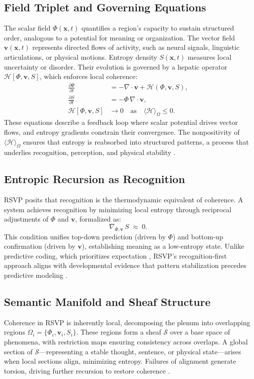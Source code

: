 \documentclass[11pt]{article}
\begin{document}
\subsection{Field Triplet and Governing Equations}
The scalar field $\Phi(\mathbf{x},t)$ quantifies a region’s capacity to sustain structured order, analogous to a potential for meaning or organization. The vector field $\mathbf{v}(\mathbf{x},t)$ represents directed flows of activity, such as neural signals, linguistic articulations, or physical motions. Entropy density $S(\mathbf{x},t)$ measures local uncertainty or disorder. Their evolution is governed by a hepatic operator $\mathcal{H}[\Phi,\mathbf{v},S]$, which enforces local coherence:
\begin{align}
\frac{\partial \Phi}{\partial t} &= -\nabla \!\cdot\! \mathbf{v} + \mathcal{H}(\Phi,\mathbf{v},S), \label{eq:phi-evo}\\[4pt]
\frac{\partial S}{\partial t} &= -\Phi\, \nabla \!\cdot\! \mathbf{v}, \label{eq:entropy-evo}\\[4pt]
\mathcal{H}[\Phi,\mathbf{v},S] &\to 0 \quad \text{as} \quad \langle \mathcal{H} \rangle_\Omega \le 0. \label{eq:hepatic}
\end{align}
These equations describe a feedback loop where scalar potential drives vector flows, and entropy gradients constrain their convergence. The nonpositivity of $\langle \mathcal{H} \rangle_\Omega$ ensures that entropy is reabsorbed into structured patterns, a process that underlies recognition, perception, and physical stability \citep{engbersen2013brains}.

\subsection{Entropic Recursion as Recognition}
RSVP posits that recognition is the thermodynamic equivalent of coherence. A system achieves recognition by minimizing local entropy through reciprocal adjustments of $\Phi$ and $\mathbf{v}$, formalized as:
\[
\nabla_{\!\Phi,\mathbf{v}}\,S \;\approx\; 0.
\]
This condition unifies top-down prediction (driven by $\Phi$) and bottom-up confirmation (driven by $\mathbf{v}$), establishing meaning as a low-entropy state. Unlike predictive coding, which prioritizes expectation \citep{friston2010free}, RSVP’s recognition-first approach aligns with developmental evidence that pattern stabilization precedes predictive modeling \citep{piaget1980thinking, gibson1979ecological}.

\subsection{Semantic Manifold and Sheaf Structure}
Coherence in RSVP is inherently local, decomposing the plenum into overlapping regions $\Omega_i = \{\Phi_i, \mathbf{v}_i, S_i\}$. These regions form a sheaf $\mathcal{S}$ over a base space of phenomena, with restriction maps ensuring consistency across overlaps. A global section of $\mathcal{S}$---representing a stable thought, sentence, or physical state---arises when local sections align, minimizing entropy. Failures of alignment generate torsion, driving further recursion to restore coherence \citep{everaert2011semiotics}.
\end{document}
